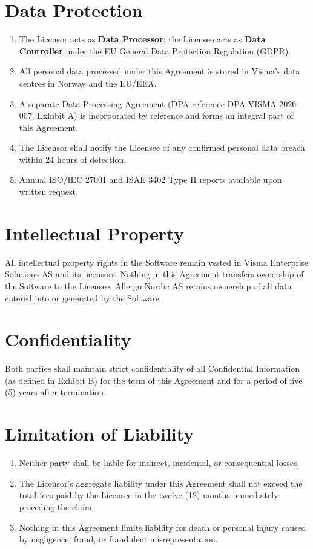\documentclass[a4paper,11pt]{article}
\begin{document}
\section{Data Protection}

\begin{enumerate}[leftmargin=*, label=\arabic{*}.]
  \item The Licensor acts as \textbf{Data Processor}; the Licensee acts as \textbf{Data Controller}
    under the EU General Data Protection Regulation (GDPR).
  \item All personal data processed under this Agreement is stored in Visma's data centres
    in Norway and the EU/EEA.
  \item A separate Data Processing Agreement (DPA reference DPA-VISMA-2026-007, Exhibit A) is
    incorporated by reference and forms an integral part of this Agreement.
  \item The Licensor shall notify the Licensee of any confirmed personal data breach within
    24 hours of detection.
  \item Annual ISO/IEC 27001 and ISAE 3402 Type II reports available upon written request.
\end{enumerate}

\section{Intellectual Property}

All intellectual property rights in the Software remain vested in Visma Enterprise Solutions AS
and its licensors. Nothing in this Agreement transfers ownership of the Software to the Licensee.
Allergo Nordic AS retains ownership of all data entered into or generated by the Software.

\section{Confidentiality}

Both parties shall maintain strict confidentiality of all Confidential Information (as defined
in Exhibit B) for the term of this Agreement and for a period of five (5) years after termination.

\section{Limitation of Liability}

\begin{enumerate}[leftmargin=*, label=\arabic{*}.]
  \item Neither party shall be liable for indirect, incidental, or consequential losses.
  \item The Licensor's aggregate liability under this Agreement shall not exceed the total
    fees paid by the Licensee in the twelve (12) months immediately preceding the claim.
  \item Nothing in this Agreement limits liability for death or personal injury caused by
    negligence, fraud, or fraudulent misrepresentation.
\end{enumerate}
\end{document}
